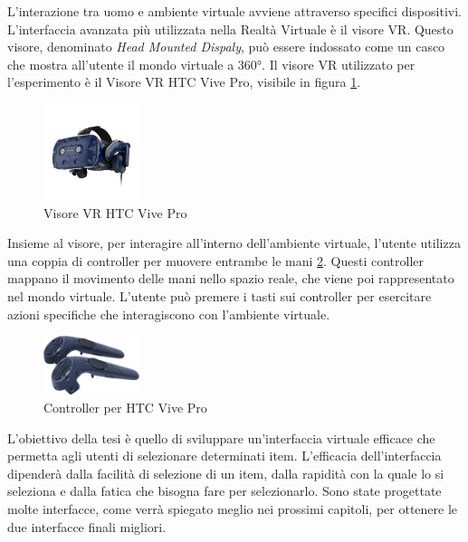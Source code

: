 \documentclass[target=bach,aauheader=]{thud}
\begin{document}
L'interazione tra uomo e ambiente virtuale avviene attraverso specifici dispositivi.
L'interfaccia avanzata più utilizzata nella Realtà Virtuale è il visore VR. 
Questo visore, denominato \textit{Head Mounted Dispaly}, può essere indossato come un casco che mostra all'utente il mondo virtuale a 360°.
Il visore VR utilizzato per l'esperimento è il Visore VR HTC Vive Pro, visibile in figura \ref{fig:vive_pro}.

\begin{figure}[h]
    \centering
    \includegraphics[width=0.25\textwidth]{vive_pro}
    \caption{Visore VR HTC Vive Pro}
    \label{fig:vive_pro}
\end{figure}

Insieme al visore, per interagire all'interno dell'ambiente virtuale, l'utente utilizza una coppia di controller per muovere entrambe le mani \ref{fig:vive_contr}.
Questi controller mappano il movimento delle mani nello spazio reale, che viene poi rappresentato nel mondo virtuale. 
L'utente può premere i tasti sui controller per esercitare azioni specifiche che interagiscono con l'ambiente virtuale. \\

\begin{figure}[h]
    \centering
    \includegraphics[width=0.25\textwidth]{vive_contr}
    \caption{Controller per HTC Vive Pro}
    \label{fig:vive_contr}
\end{figure}

\newpage
L'obiettivo della tesi è quello di sviluppare un'interfaccia virtuale efficace che permetta agli utenti di selezionare determinati item.
L'efficacia dell'interfaccia dipenderà dalla facilità di selezione di un item, dalla rapidità con la quale lo si seleziona e dalla fatica che bisogna fare per selezionarlo.
Sono state progettate molte interfacce, come verrà spiegato meglio nei prossimi capitoli, per ottenere le due interfacce finali migliori. \\
\end{document}
